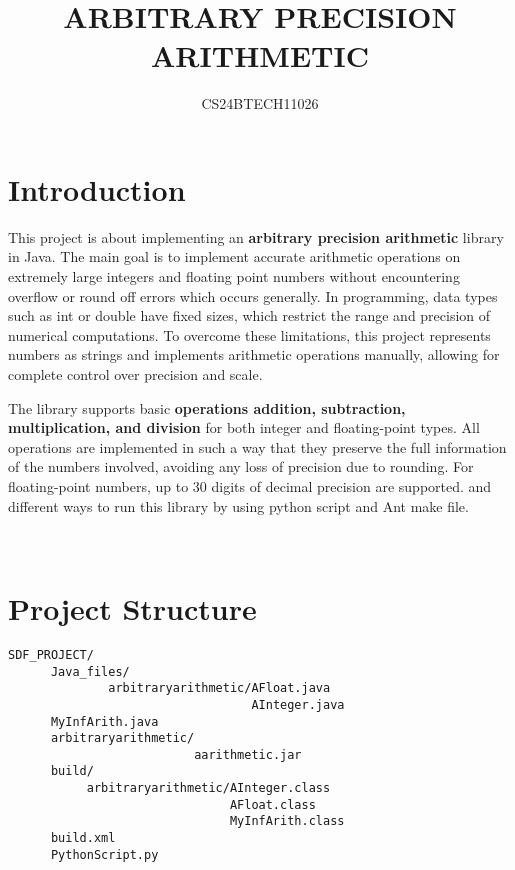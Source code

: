 \documentclass{article}
\title{ARBITRARY PRECISION ARITHMETIC}
\author{CS24BTECH11026}
\begin{document}
\maketitle


\section*{Introduction}

This project is about implementing an \textbf{arbitrary precision arithmetic} library in Java. The main goal is to implement accurate arithmetic operations on extremely large integers and floating point numbers without encountering overflow or round off errors which occurs generally. In programming, data types such as int or double have fixed sizes, which restrict the range and precision of numerical computations. To overcome these limitations, this project represents numbers as strings and implements arithmetic operations manually, allowing for complete control over precision and scale.
\newline

The library supports basic \textbf{operations addition, subtraction, multiplication, and division} for both integer and floating-point types. All operations are implemented in such a way that they preserve the full information of the numbers involved, avoiding any loss of precision due to rounding. For floating-point numbers, up to 30 digits of decimal precision are supported. and different ways to run this library by using python script and Ant make file.




\

\section*{Project Structure}
\begin{verbatim}
SDF_PROJECT/
      Java_files/                             
              arbitraryarithmetic/AFloat.java
                                  AInteger.java
      MyInfArith.java 
      arbitraryarithmetic/                    
                          aarithmetic.jar                  
      build/                                  
           arbitraryarithmetic/AInteger.class
                               AFloat.class
                               MyInfArith.class                        
      build.xml    
      PythonScript.py                        
                            
\end{verbatim}
\end{document}
